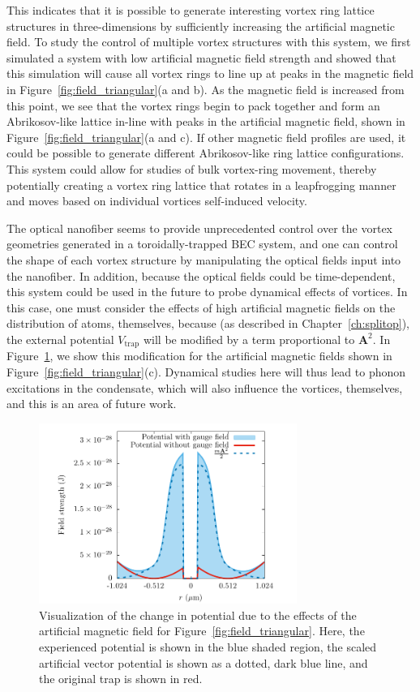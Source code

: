 This indicates that it is possible to generate interesting vortex ring lattice structures in three-dimensions by sufficiently increasing the artificial magnetic field.
To study the control of multiple vortex structures with this system, we first simulated a system with low artificial magnetic field strength and showed that this simulation will cause all vortex rings to line up at peaks in the magnetic field in Figure~\ref{fig:field_triangular}(a and b).
As the magnetic field is increased from this point, we see that the vortex rings begin to pack together and form an Abrikosov-like lattice in-line with peaks in the artificial magnetic field, shown in Figure~\ref{fig:field_triangular}(a and c).
If other magnetic field profiles are used, it could be possible to generate different Abrikosov-like ring lattice configurations.
This system could allow for studies of bulk vortex-ring movement, thereby potentially creating a vortex ring lattice that rotates in a leapfrogging manner and moves based on individual vortices self-induced velocity.

The optical nanofiber seems to provide unprecedented control over the vortex geometries generated in a toroidally-trapped BEC system, and one can control the shape of each vortex structure by manipulating the optical fields input into the nanofiber.
In addition, because the optical fields could be time-dependent, this system could be used in the future to probe dynamical effects of vortices.
In this case, one must consider the effects of high artificial magnetic fields on the distribution of atoms, themselves, because (as described in Chapter~\ref{ch:splitop}), the external potential $V_\text{trap}$ will be modified by a term proportional to $\mathbf{A}^2$.
In Figure~\ref{fig:V_change}, we show this modification for the artificial magnetic fields shown in Figure~\ref{fig:field_triangular}(c).
Dynamical studies here will thus lead to phonon excitations in the condensate, which will also influence the vortices, themselves, and this is an area of future work.

\begin{figure}
\center \includegraphics[width=0.75\textwidth]{data/3d/V_change.pdf}
\caption{Visualization of the change in potential due to the effects of the artificial magnetic field for Figure~\ref{fig:field_triangular}.
Here, the experienced potential is shown in the blue shaded region, the scaled artificial vector potential is shown as a dotted, dark blue line, and the original trap is shown in red.}
\label{fig:V_change}
\end{figure}


